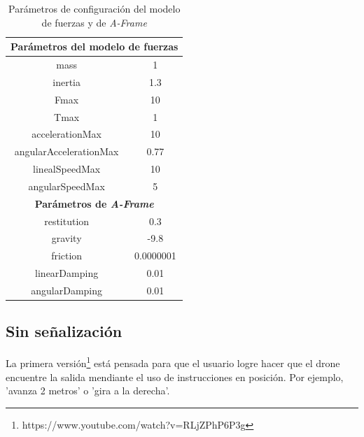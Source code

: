 \clearpage
\begin{table}[h!]
\centering
\begin{tabular}{|c|c|}
\hline
\multicolumn{2}{|c|}{\textbf{Parámetros del modelo de fuerzas}}                \\ \hline
mass                                           & 1                             \\ \hline
inertia                                        & 1.3                           \\ \hline
Fmax                                           & 10                            \\ \hline
Tmax                                           & 1                             \\ \hline
accelerationMax                                & 10                            \\ \hline
angularAccelerationMax                         & 0.77                          \\ \hline
linealSpeedMax                                 & 10                            \\ \hline
angularSpeedMax                                & 5                             \\ \hline
\multicolumn{2}{|c|}{\textbf{Parámetros de \textit{A-Frame}}} \\ \hline
restitution                                    & 0.3                           \\ \hline
gravity                                        & -9.8                          \\ \hline
friction                                       &  0.0000001                       \\ \hline
linearDamping                                  & 0.01                         \\ \hline
angularDamping                                 & 0.01                         \\ \hline
\end{tabular}
\caption{Parámetros de configuración del modelo de fuerzas y de \textit{A-Frame}}
\label{tabla:param_ej3}
\end{table}

\subsection{Sin señalización}
La primera versión\footnote{https://www.youtube.com/watch?v=RLjZPhP6P3g} está pensada para que el usuario logre hacer que el drone encuentre la salida mendiante el uso de instrucciones en posición. Por ejemplo, 'avanza 2 metros' o 'gira a la derecha'.

